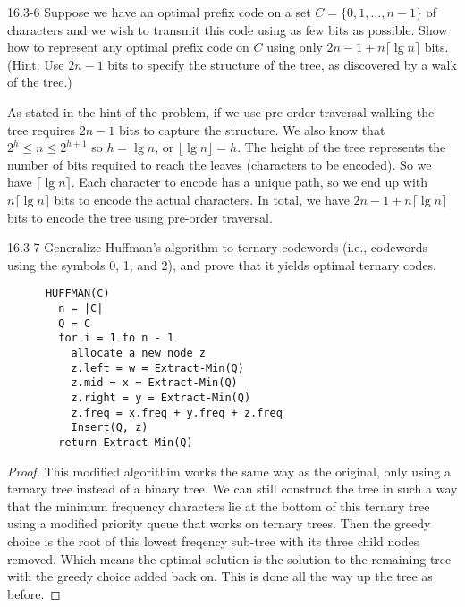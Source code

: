 





\homeworkheader{\classnameandsection}

\begin{problem}{16.3-6}
  Suppose we have an optimal prefix code on a set $C = \{0,1,\ldots,n-1\}$ of characters and we wish to transmit this
  code using as few bits as possible. Show how to represent any optimal prefix code on $C$ using only $2n - 1 + n \lceil
  \lg n \rceil$ bits. (Hint: Use $2n - 1$ bits to specify the structure of the tree, as discovered by a walk of the
  tree.)
  \begin{solution}
    As stated in the hint of the problem, if we use pre-order traversal walking the tree requires $2n - 1$ bits to
    capture the structure. We also know that $2^h \le n \le 2^{h + 1}$ so $h = \lg n$, or $\lfloor \lg n \rfloor = h$.
    The height of the tree represents the number of bits required to reach the leaves (characters to be encoded). So we
    have $\lceil \lg n \rceil$. Each character to encode has a unique path, so we end up with $n \lceil \lg n \rceil$
    bits to encode the actual characters.  In total, we have $2n - 1 + n \lceil \lg n \rceil$ bits to encode the tree
    using pre-order traversal.
  \end{solution}
\end{problem}

\begin{problem}{16.3-7}
  Generalize Huffman's algorithm to ternary codewords (i.e., codewords using the symbols 0, 1, and 2), and prove that it
  yields optimal ternary codes.
  \begin{solution}
    \begin{lstlisting}
      HUFFMAN(C)
        n = |C|
        Q = C
        for i = 1 to n - 1
          allocate a new node z
          z.left = w = Extract-Min(Q)
          z.mid = x = Extract-Min(Q)
          z.right = y = Extract-Min(Q)
          z.freq = x.freq + y.freq + z.freq
          Insert(Q, z)
        return Extract-Min(Q)
    \end{lstlisting}
    \begin{proof}
      This modified algorithim works the same way as the original, only using a ternary tree instead of a binary tree.
      We can still construct the tree in such a way that the minimum frequency characters lie at the bottom of this
      ternary tree using a modified priority queue that works on ternary trees. Then the greedy choice is the root of
      this lowest freqency sub-tree with its three child nodes removed. Which means the optimal solution is the solution
      to the remaining tree with the greedy choice added back on.  This is done all the way up the tree as before.
    \end{proof}
  \end{solution}
\end{problem}

